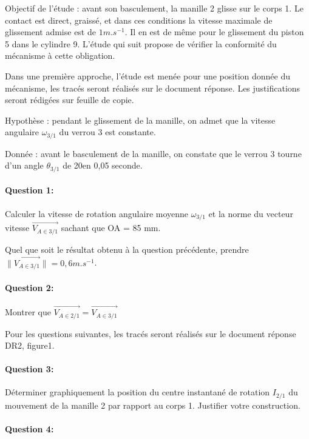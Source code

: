 Objectif de l'étude : avant son basculement, la manille 2 glisse sur le corps 1. Le contact est direct, graissé, et dans ces conditions la vitesse maximale de glissement admise est de $1 m.s^{-1}$. Il en est de même pour le glissement du piston 5 dans le cylindre 9. L'étude qui suit propose de vérifier la conformité du mécanisme à cette obligation.

Dans une première approche, l'étude est menée pour une position donnée du mécanisme, les tracés seront réalisés sur le document réponse. Les justifications seront rédigées sur feuille de copie.

Hypothèse : pendant le glissement de la manille, on admet que la vitesse angulaire $\omega_{3/1}$ du verrou 3 est constante.

Donnée : avant le basculement de la manille, on constate que le verrou 3 tourne d'un 	angle $\theta_{3/1}$ de 20\textdegree  en 0,05 seconde.

\paragraph{Question 1:}

Calculer la vitesse de rotation angulaire moyenne $\omega_{3/1}$ et la norme du vecteur vitesse $\overrightarrow{V_{A \in 3/1}}$ sachant que OA = 85 mm.

Quel que soit le résultat obtenu à la question précédente, prendre $\|\overrightarrow{V_{A \in 3/1}}\|=0,6m.s^{-1}$.

\paragraph{Question 2:}

Montrer que $\overrightarrow{V_{A \in 2/1}}=\overrightarrow{V_{A \in 3/1}}$

Pour les questions suivantes, les tracés seront réalisés sur le document réponse DR2, figure1.

\paragraph{Question 3:}

Déterminer graphiquement la position du centre instantané de rotation \og $I_{2/1}$ \fg du mouvement de la manille 2 par rapport au corps 1. Justifier votre construction.

\paragraph{Question 4:}

